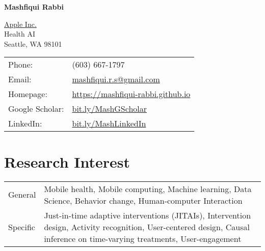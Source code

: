 \documentclass[10pt,fullpage]{article}
\def\name{Mashfiqui Rabbi}
\begin{document}


\centerline{\Large \bf \name}
\vspace{0.25in}
\begin{minipage}{0.50\linewidth}
  \href{http://www.apple.com/}{Apple Inc.} \\
  Health AI\\
  Seattle, WA 98101
\end{minipage}
\begin{minipage}{0.50\linewidth}
  \begin{tabular}{ll}
    Phone: & (603) 667-1797 \\
    Email: & \href{mailto:mashfiqui.r.s@gmail.com}{mashfiqui.r.s@gmail.com} \\
    Homepage: & \href{https://mashfiqui-rabbi.github.io/}{https://mashfiqui-rabbi.github.io}\\
    Google Scholar: & \href{http://bit.ly/MashGScholar}{bit.ly/MashGScholar}\\
    LinkedIn: & \href{http://bit.ly/MashLinkedIn}{bit.ly/MashLinkedIn}
  \end{tabular}
\end{minipage}



\section*{\textbf{Research Interest}}
\vspace{-0.5em}
\begin{longtable}{p{0.7in}|p{5.5in}}
		General & Mobile health, Mobile computing, Machine learning, Data Science, Behavior change, Human-computer Interaction \vspace{0.15cm}\\
	Specific & Just-in-time adaptive interventions (JITAIs), Intervention design, Activity recognition, User-centered design, Causal inference on time-varying treatments, User-engagement \\
\end{longtable}
\end{document}
